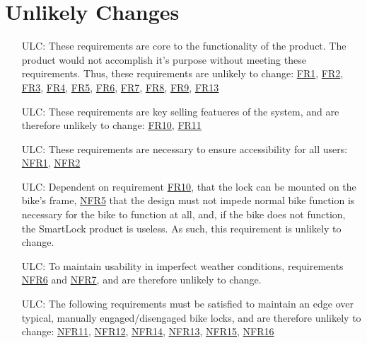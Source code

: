 \documentclass[12pt]{article}
\newcounter{lcnum} %
\newcounter{ulcnum} %
\begin{document}
\section{Unlikely Changes}    

\noindent \begin{itemize}


\item[ULC\refstepcounter{ulcnum}\theulcnum\label{LC_meaningfulLabel}:] These requirements are core to the functionality of the product. The product would not accomplish it's purpose without meeting these requirements. Thus, these requirements are  unlikely to change: \hyperref[FR1]{FR1}, \hyperref[FR2]{FR2}, \hyperref[FR3]{FR3}, \hyperref[FR4]{FR4}, \hyperref[FR5]{FR5}, \hyperref[FR6]{FR6}, \hyperref[FR7]{FR7}, \hyperref[FR8]{FR8}, \hyperref[FR9]{FR9}, \hyperref[FR13]{FR13}
\item[ULC\refstepcounter{ulcnum}\theulcnum\label{LC_meaningfulLabel}:] These requirements are key selling featueres of the system, and are therefore unlikely to change: \hyperref[FR10]{FR10}, \hyperref[FR11]{FR11}
\item[ULC\refstepcounter{ulcnum}\theulcnum\label{LC_meaningfulLabel}:] These requirements are necessary to ensure accessibility for all users: \hyperref[NFR1]{NFR1}, \hyperref[NFR2]{NFR2}
\item[ULC\refstepcounter{ulcnum}\theulcnum\label{LC_meaningfulLabel}:] Dependent on requirement \hyperref[FR10]{ FR10}, that the lock can be mounted on the bike's frame, \hyperref[NFR5]{NFR5} that the design must not impede normal bike function is necessary for the bike to function at all, and, if the bike does not function, the SmartLock product is useless. As such, this requirement is unlikely to change.
\item[ULC\refstepcounter{ulcnum}\theulcnum\label{LC_meaningfulLabel}:] To maintain usability in imperfect weather conditions, requirements \hyperref[NFR6]{NFR6} and \hyperref[NFR7]{NFR7}, and are therefore unlikely to change. \item[ULC\refstepcounter{ulcnum}\theulcnum\label{LC_meaningfulLabel}:] The following requirements must be satisfied to maintain an edge over typical, manually engaged/disengaged bike locks, and are therefore unlikely to change: \hyperref[NFR11]{NFR11}, \hyperref[NFR12]{NFR12}, \hyperref[NFR14]{NFR14}, \hyperref[NFR13]{NFR13}, \hyperref[NFR15]{NFR15}, \hyperref[NFR16]{NFR16}

\end{itemize}
\end{document}
